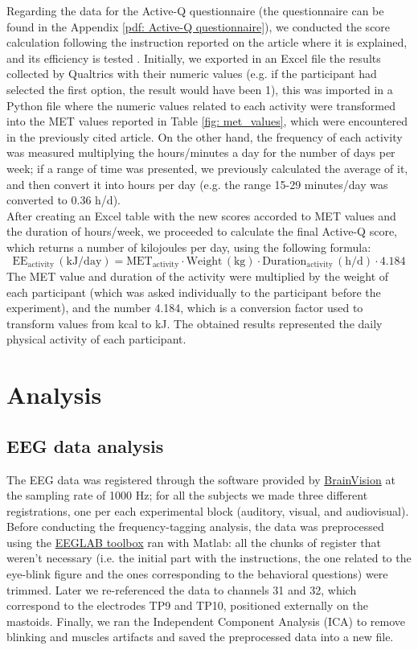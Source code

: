 Regarding the data for the Active-Q questionnaire (the questionnaire can be found in the Appendix \ref{pdf: Active-Q questionnaire}), we conducted the score calculation following the instruction reported on the article where it is explained, and its efficiency is tested \parencite{Bonn_2012}. Initially, we exported in an Excel file the results collected by Qualtrics with their numeric values (e.g. if the participant had selected the first option, the result would have been 1), this was imported in a Python file where the numeric values related to each activity were transformed into the MET values reported in Table \ref{fig: met_values}, which were encountered in the previously cited article. On the other hand, the frequency of each activity was measured multiplying the hours/minutes a day for the number of days per week; if a range of time was presented, we previously calculated the average of it, and then convert it into hours per day (e.g. the range 15-29 minutes/day was converted to 0.36 h/d).  \\
After creating an Excel table with the new scores accorded to MET values and the duration of hours/week, we proceeded to calculate the final Active-Q score, which returns a number of kilojoules per day, using the following formula: 
\[
\text{EE}_{\text{activity}} \, (\text{kJ/day}) = \text{MET}_{\text{activity}} \cdot \text{Weight} \, (\text{kg}) \cdot \text{Duration}_{\text{activity}} \, (\text{h/d}) \cdot 4.184
\]
The MET value and duration of the activity were multiplied by the weight of each participant (which was asked individually to the participant before the experiment), and the number 4.184, which is a conversion factor used to transform values from kcal to kJ. The obtained results represented the daily physical activity of each participant.

\section{Analysis}
\subsection{EEG data analysis}
The EEG data was registered through the software provided by \href{https://brainvision.com/applications/brain-vision-software/}{BrainVision} at the sampling rate of 1000 Hz; for all the subjects we made three different registrations, one per each experimental block (auditory, visual, and audiovisual). \\
Before conducting the frequency-tagging analysis, the data was preprocessed using the \href{https://eeglab.org/}{EEGLAB toolbox} ran with Matlab: all the chunks of register that weren't necessary (i.e. the initial part with the instructions, the one related to the eye-blink figure and the ones corresponding to the behavioral questions) were trimmed. Later we re-referenced the data to channels 31 and 32, which correspond to the electrodes TP9 and TP10, positioned externally on the mastoids. Finally, we ran the Independent Component Analysis (ICA) to remove blinking and muscles artifacts and saved the preprocessed data into a new file. 

